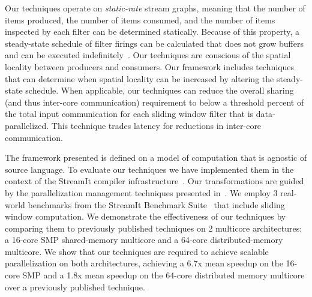 Our techniques operate on {\it static-rate} stream graphs, meaning
that the number of items produced, the number of items consumed, and
the number of items inspected by each filter can be determined
statically.  Because of this property, a steady-state schedule of
filter firings can be calculated that does not grow buffers and can be
executed indefinitely~\cite{lee87}.  Our techniques are conscious of
the spatial locality between producers and consumers.  Our framework
includes techniques that can determine when spatial locality can be
increased by altering the steady-state schedule.  When applicable, our
techniques can reduce the overall sharing (and thus inter-core
communication) requirement to below a threshold percent of the total
input communication for each sliding window filter that is
data-parallelized.  This technique trades latency for reductions in
inter-core communication.

The framework presented is defined on a model of computation that is
agnostic of source language.  To evaluate our techniques we have
implemented them in the context of the StreamIt compiler
infrastructure~\cite{gordon-asplos06}.  Our transformations are guided
by the parallelization management techniques presented
in~\cite{gordon-asplos06}.  We employ 3 real-world benchmarks from the
StreamIt Benchmark Suite~\cite{streamit-suite} that include sliding
window computation.  We demonstrate the effectiveness of our
techniques by comparing them to previously published techniques on 2
multicore architectures: a 16-core SMP shared-memory multicore and a
64-core distributed-memory multicore.  We show that our techniques are
required to achieve scalable parallelization on both architectures,
achieving a 6.7x mean speedup on the 16-core SMP and a 1.8x mean
speedup on the 64-core distributed memory multicore over a previously
published technique.

